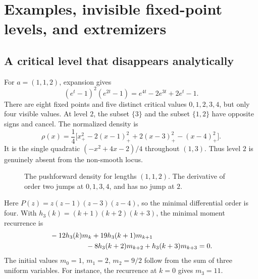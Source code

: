 \documentclass[11pt]{article}
\theoremstyle{definition}
\theoremstyle{remark}
\numberwithin{equation}{section}
\begin{document}
\section{Examples, invisible fixed-point levels, and extremizers}
\label{sec:examples}
\subsection{A critical level that disappears analytically}
For $a=(1,1,2)$, expansion gives
\begin{equation}\label{eq:112}
 (e^t-1)^2(e^{2t}-1)=e^{4t}-2e^{3t}+2e^t-1.
\end{equation}
There are eight fixed points and five distinct critical values
$0,1,2,3,4$, but only four visible values. At level $2$, the subset
$\{3\}$ and the subset $\{1,2\}$ have opposite signs and cancel.
The normalized density is
\[
 \rho(x)=\frac14\bigl[x_+^2-2(x-1)_+^2
                       +2(x-3)_+^2-(x-4)_+^2\bigr].
\]
It is the single quadratic $(-x^2+4x-2)/4$ throughout $(1,3)$.
Thus level $2$ is genuinely absent from the non-smooth locus.

\begin{figure}[ht]
\centering
{}
\caption{The pushforward density for lengths $(1,1,2)$. The derivative
of order two jumps at $0,1,3,4$, and has no jump at $2$.}
\end{figure}

Here $P(z)=z(z-1)(z-3)(z-4)$, so the minimal differential order is
four. With $h_3(k)=(k+1)(k+2)(k+3)$, the minimal moment recurrence is
\begin{align*}
 &-12h_3(k)m_k+19h_3(k+1)m_{k+1}\\
 &\hspace{18mm}-8h_3(k+2)m_{k+2}+h_3(k+3)m_{k+3}=0.
\end{align*}
The initial values $m_0=1$, $m_1=2$, $m_2=9/2$ follow from the sum
of three uniform variables. For instance, the recurrence at $k=0$
gives $m_3=11$.
\end{document}
